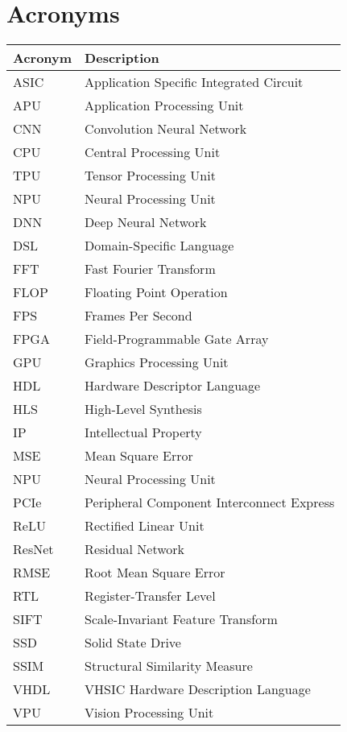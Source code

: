 \label{chap:symbols}
\section*{Acronyms}
\begin{tabular}{l|l}
\hline
Acronym & Description \\
\hline
ASIC & Application Specific Integrated Circuit \\
APU & Application Processing Unit \\
CNN & Convolution Neural Network \\
CPU & Central Processing Unit \\
TPU & Tensor Processing Unit \\
NPU & Neural Processing Unit \\
DNN & Deep Neural Network \\
DSL & Domain-Specific Language \\
FFT & Fast Fourier Transform \\
FLOP & Floating Point Operation \\
FPS & Frames Per Second \\
FPGA & Field-Programmable Gate Array \\
GPU & Graphics Processing Unit \\
HDL & Hardware Descriptor Language \\
HLS & High-Level Synthesis \\
IP & Intellectual Property \\
MSE & Mean Square Error \\
NPU  & Neural Processing Unit \\
PCIe & Peripheral Component Interconnect Express \\
ReLU & Rectified Linear Unit \\
ResNet & Residual Network \\
RMSE & Root Mean Square Error \\
RTL & Register-Transfer Level \\
SIFT & Scale-Invariant Feature Transform   \\
SSD & Solid State Drive \\
SSIM & Structural Similarity Measure \\
VHDL & VHSIC Hardware Description Language \\
VPU  & Vision Processing Unit \\
\hline
\end{tabular}




